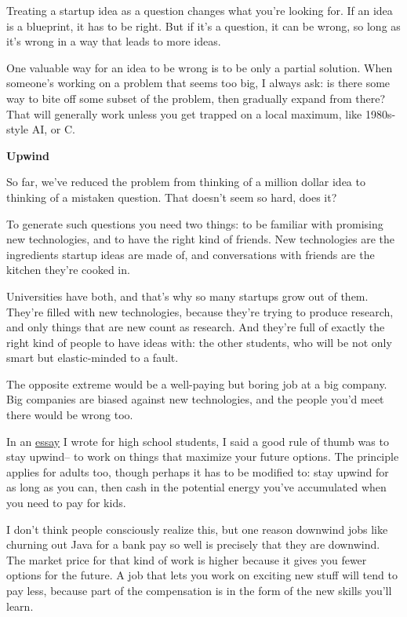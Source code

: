 \documentclass[12pt]{book}
\begin{document}
Treating a startup idea as a question changes what you're looking for.
If an idea is a blueprint, it has to be right. But if it's a question,
it can be wrong, so long as it's wrong in a way that leads to more
ideas.

One valuable way for an idea to be wrong is to be only a partial
solution. When someone's working on a problem that seems too big, I
always ask: is there some way to bite off some subset of the problem,
then gradually expand from there? That will generally work unless you
get trapped on a local maximum, like 1980s-style AI, or C.

\textbf{Upwind}

So far, we've reduced the problem from thinking of a million dollar idea
to thinking of a mistaken question. That doesn't seem so hard, does it?

To generate such questions you need two things: to be familiar with
promising new technologies, and to have the right kind of friends. New
technologies are the ingredients startup ideas are made of, and
conversations with friends are the kitchen they're cooked in.

Universities have both, and that's why so many startups grow out of
them. They're filled with new technologies, because they're trying to
produce research, and only things that are new count as research. And
they're full of exactly the right kind of people to have ideas with: the
other students, who will be not only smart but elastic-minded to a
fault.

The opposite extreme would be a well-paying but boring job at a big
company. Big companies are biased against new technologies, and the
people you'd meet there would be wrong too.

In an \href{hs.html}{essay} I wrote for high school students, I said a
good rule of thumb was to stay upwind-- to work on things that maximize
your future options. The principle applies for adults too, though
perhaps it has to be modified to: stay upwind for as long as you can,
then cash in the potential energy you've accumulated when you need to
pay for kids.

I don't think people consciously realize this, but one reason downwind
jobs like churning out Java for a bank pay so well is precisely that
they are downwind. The market price for that kind of work is higher
because it gives you fewer options for the future. A job that lets you
work on exciting new stuff will tend to pay less, because part of the
compensation is in the form of the new skills you'll learn.
\end{document}
